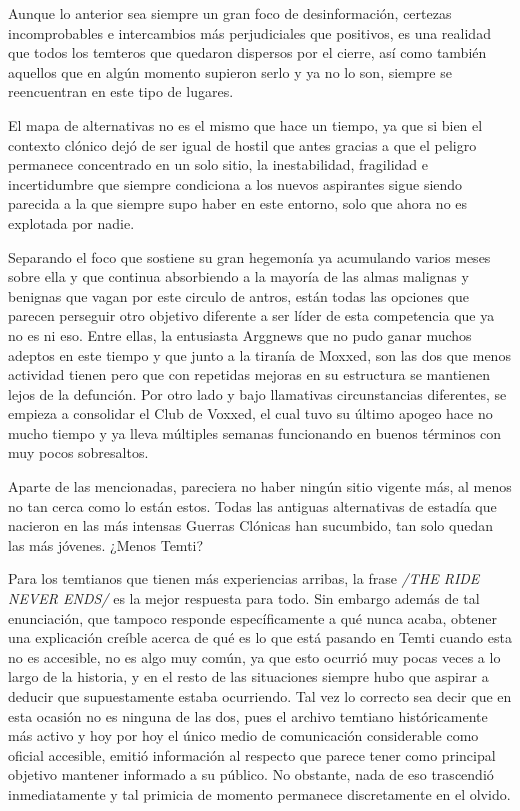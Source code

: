 \documentclass[
]{book}
\begin{document}
Aunque lo anterior sea siempre un gran foco de desinformación, certezas incomprobables e intercambios más perjudiciales que positivos, es una realidad que todos los temteros que quedaron dispersos por el cierre, así como también aquellos que en algún momento supieron serlo y ya no lo son, siempre se reencuentran en este tipo de lugares.

El mapa de alternativas no es el mismo que hace un tiempo, ya que si bien el contexto clónico dejó de ser igual de hostil que antes gracias a que el peligro permanece concentrado en un solo sitio, la inestabilidad, fragilidad e incertidumbre que siempre condiciona a los nuevos aspirantes sigue siendo parecida a la que siempre supo haber en este entorno, solo que ahora no es explotada por nadie.

Separando el foco que sostiene su gran hegemonía ya acumulando varios meses sobre ella y que continua absorbiendo a la mayoría de las almas malignas y benignas que vagan por este circulo de antros, están todas las opciones que parecen perseguir otro objetivo diferente a ser líder de esta competencia que ya no es ni eso. Entre ellas, la entusiasta Arggnews que no pudo ganar muchos adeptos en este tiempo y que junto a la tiranía de Moxxed, son las dos que menos actividad tienen pero que con repetidas mejoras en su estructura se mantienen lejos de la defunción. Por otro lado y bajo llamativas circunstancias diferentes, se empieza a consolidar el Club de Voxxed, el cual tuvo su último apogeo hace no mucho tiempo y ya lleva múltiples semanas funcionando en buenos términos con muy pocos sobresaltos.

Aparte de las mencionadas, pareciera no haber ningún sitio vigente más, al menos no tan cerca como lo están estos. Todas las antiguas alternativas de estadía que nacieron en las más intensas Guerras Clónicas han sucumbido, tan solo quedan las más jóvenes. ¿Menos Temti?

Para los temtianos que tienen más experiencias arribas, la frase \emph{/THE RIDE NEVER ENDS/} es la mejor respuesta para todo. Sin embargo además de tal enunciación, que tampoco responde específicamente a qué nunca acaba, obtener una explicación creíble acerca de qué es lo que está pasando en Temti cuando esta no es accesible, no es algo muy común, ya que esto ocurrió muy pocas veces a lo largo de la historia, y en el resto de las situaciones siempre hubo que aspirar a deducir que supuestamente estaba ocurriendo. Tal vez lo correcto sea decir que en esta ocasión no es ninguna de las dos, pues el archivo temtiano históricamente más activo y hoy por hoy el único medio de comunicación considerable como oficial accesible, emitió información al respecto que parece tener como principal objetivo mantener informado a su público. No obstante, nada de eso trascendió inmediatamente y tal primicia de momento permanece discretamente en el olvido.
\end{document}
